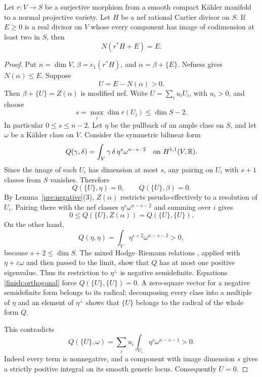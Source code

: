 \begin{lemma}\label{finish:exceptional}
Let \(r:V\to S\) be a surjective morphism from a smooth compact K\"ahler
manifold to a normal projective variety. Let \(H\) be a nef rational
Cartier divisor on \(S\). If \(E\geq0\) is a real divisor on \(V\) whose
every component has image of codimension at least two in \(S\), then
\[
 N(r^*H+E)=E.
\]
\end{lemma}
\begin{proof}
Put \(n=\dim V\), \(\beta=c_1(r^*H)\), and
\(\alpha=\beta+\{E\}\). Nefness gives \(N(\alpha)\leq E\).
Suppose
\[
 U=E-N(\alpha)>0.
\]
Then \(\beta+\{U\}=Z(\alpha)\) is modified nef. Write
\(U=\sum_i u_iU_i\), with \(u_i>0\), and choose
\[
 s=\max_i\dim r(U_i)\leq\dim S-2.
\]
In particular \(0\leq s\leq n-2\). Let \(\eta\) be the pullback of an
ample class on \(S\), and let \(\omega\) be a K\"ahler class on \(V\).
Consider the symmetric bilinear form
\[
 Q(\gamma,\delta)=\int_V\gamma\,\delta\,\eta^s\omega^{n-s-2}
 \quad\text{on }H^{1,1}(V,\mathbb R).
\]
Since the image of each \(U_i\) has dimension at most \(s\), any pairing
on \(U_i\) with \(s+1\) classes from \(S\) vanishes. Therefore
\begin{equation}\label{finish:orthogonal}
 Q(\{U\},\eta)=0,\qquad Q(\{U\},\beta)=0.
\end{equation}
By Lemma~\ref{pre:negative}(3), \(Z(\alpha)\) restricts
pseudo-effectively to a resolution of \(U_i\). Pairing there with the
nef classes \(\eta^s\omega^{n-s-2}\) and summing over \(i\) gives
\[
 0\leq Q(\{U\},Z(\alpha))=Q(\{U\},\{U\}).
\]
On the other hand,
\[
 Q(\eta,\eta)=\int_V\eta^{s+2}\omega^{n-s-2}>0,
\]
because \(s+2\leq\dim S\). The mixed Hodge--Riemann relations
\cite[Theorem~A]{DinhNguyen}, applied with
\(\eta+\varepsilon\omega\) and then passed to the limit, show that \(Q\)
has at most one positive eigenvalue. Thus its restriction to
\(\eta^\perp\) is negative semidefinite. Equations
\eqref{finish:orthogonal} force \(Q(\{U\},\{U\})=0\).
A zero-square vector for a negative semidefinite form belongs to its
radical; decomposing every class into a multiple of \(\eta\) and an
element of \(\eta^\perp\) shows that \(\{U\}\) belongs to the radical of
the whole form \(Q\).

This contradicts
\[
 Q(\{U\},\omega)=
 \sum_i u_i\int_{U_i}\eta^s\omega^{n-s-1}>0.
\]
Indeed every term is nonnegative, and a component with image dimension
\(s\) gives a strictly positive integral on its smooth generic locus.
Consequently \(U=0\).
\end{proof}

